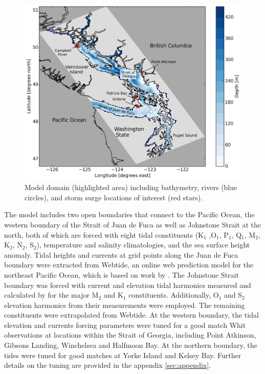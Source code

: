 \documentclass[pdftex,10pt]{article}
\begin{document}
\begin{figure}[h]
\centering
\includegraphics[scale=0.5]{Figures/bathy.pdf}
\caption{Model domain (highlighted area) including bathymetry, rivers (blue circles), and storm surge locations of interest  (red stars).}\label{fig:domain}
\end{figure}

The model includes two open boundaries that connect to the Pacific Ocean, the western boundary of the Strait of Juan de Fuca as well as Johnstone Strait at the north, both of which are forced with eight tidal constituents (K$_1$ ,O$_1$, P$_1$, Q$_1$, M$_2$, K$_2$, N$_2$, S$_2$), temperature and salinity climatologies, and the sea surface height anomaly. Tidal heights and currents at grid points along the Juan de Fuca boundary were extracted from Webtide, an online web prediction model for the northeast Pacific Ocean, which is based on work by \citet{foreman2000webtide}. The Johnstone Strait boundary was forced with current and elevation tidal harmonics measured and calculated by \citet{thomson1980johnstone} for the major M$_2$ and K$_1$ constituents. Additionally, O$_1$ and S$_2$ elevation harmonics from their measurements were employed. The remaining constituents were extrapolated from Webtide. At the western boundary, the tidal elevation and currents forcing parameters were tuned for a good match Whit observations at locations within the Strait of Georgia, including Point Atkinson, Gibsons Landing, Winchelsea and Halfmoon Bay. At the northern boundary, the tides were tuned for good matches at Yorke Island and Kelsey Bay. Further details on the tuning are provided in the appendix \ref{sec:appendix}. 
\end{document}

